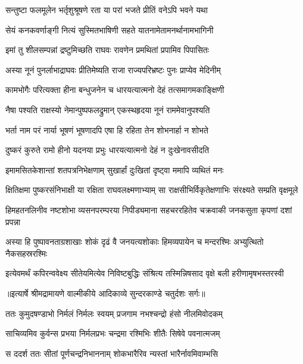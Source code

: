 \twolineshloka
{सन्तुष्टा फलमूलेन भर्तृशुश्रूषणे रता}
{या परां भजते प्रीतिं वनेऽपि भवने यथा} %

\twolineshloka
{सेयं कनकवर्णाङ्गी नित्यं सुस्मितभाषिणी}
{सहते यातनामेतामनर्थानामभागिनी} %

\twolineshloka
{इमां तु शीलसम्पन्नां द्रष्टुमिच्छति राघवः}
{रावणेन प्रमथितां प्रपामिव पिपासितः} %

\twolineshloka
{अस्या नूनं पुनर्लाभाद्राघवः प्रीतिमेष्यति}
{राजा राज्यपरिभ्रष्टः पुनः प्राप्येव मेदिनीम्} %

\twolineshloka
{कामभोगैः परित्यक्ता हीना बन्धुजनेन च}
{धारयत्यात्मनो देहं तत्समागमकाङ्क्षिणी} %

\twolineshloka
{नैषा पश्यति राक्षस्यो नेमान्पुष्पफलद्रुमान्}
{एकस्थहृदया नूनं राममेवानुपश्यति} %

\twolineshloka
{भर्ता नाम परं नार्या भूषणं भूषणादपि}
{एषा हि रहिता तेन शोभनार्हा न शोभते} %

\twolineshloka
{दुष्करं कुरुते रामो हीनो यदनया प्रभुः}
{धारयत्यात्मनो देहं न दुःखेनावसीदति} %

\twolineshloka
{इमामसितकेशान्तां शतपत्रनिभेक्षणाम्}
{सुखार्हां दुःखितां दृष्ट्वा ममापि व्यथितं मनः} %

\fourlineindentedshloka
{क्षितिक्षमा पुष्करसंनिभाक्षी}
{या रक्षिता राघवलक्ष्मणाभ्याम्}
{सा राक्षसीभिर्विकृतेक्षणाभिः}
{संरक्ष्यते सम्प्रति वृक्षमूले} %

\fourlineindentedshloka
{हिमहतनलिनीव नष्टशोभा}
{व्यसनपरम्परया निपीड्यमाना}
{सहचररहितेव चक्रवाकी}
{जनकसुता कृपणां दशां प्रपन्ना} %

\fourlineindentedshloka
{अस्या हि पुष्पावनताग्रशाखाः}
{शोकं दृढं वै जनयत्यशोकाः}
{हिमव्यपायेन च मन्दरश्मिः}
{अभ्युत्थितो नैकसहस्ररश्मिः} %

\fourlineindentedshloka
{इत्येवमर्थं कपिरन्ववेक्ष्य}
{सीतेयमित्येव निविष्टबुद्धिः}
{संश्रित्य तस्मिन्निषसाद वृक्षे}
{बली हरीणामृषभस्तरस्वी} %


{॥इत्यार्षे श्रीमद्रामायणे वाल्मीकीये आदिकाव्ये सुन्दरकाण्डे चतुर्दशः सर्गः॥}


\twolineshloka
{ततः कुमुदषण्डाभो निर्मलं निर्मलः स्वयम्}
{प्रजगाम नभश्चन्द्रो हंसो नीलमिवोदकम्} %

\twolineshloka
{साचिव्यमिव कुर्वन्स प्रभया निर्मलप्रभः}
{चन्द्रमा रश्मिभिः शीतैः सिषेवे पवनात्मजम्} %

\twolineshloka
{स ददर्श ततः सीतां पूर्णचन्द्रनिभाननाम्}
{शोकभारैरिव न्यस्तां भारैर्नावमिवाम्भसि} %

